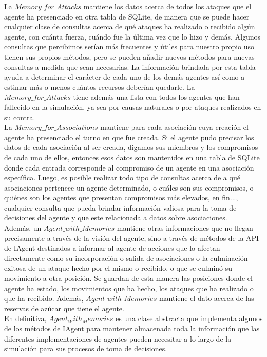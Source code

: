 \documentclass[11pt]{article}
\begin{document}
La $Memory\_for\_Attacks$ mantiene los datos acerca de todos los ataques que el agente ha presenciado en otra tabla de SQLite, de manera que se puede hacer cualquier clase de consultas acerca de qué ataques ha realizado o recibido algún agente, con cuánta fuerza, cuándo fue la última vez que lo hizo y demás. Algunos consultas que percibimos serían más frecuentes y útiles para nuestro propio uso tienen sus propios métodos, pero se pueden añadir nuevos métodos para nuevas consultas a medida que sean necesarias. La información brindada por esta tabla ayuda a determinar el carácter de cada uno de los demás agentes así como a estimar más o menos cuántos recursos deberían quedarle. La $Memory\_for\_Attacks$ tiene además una lista con todos los agentes que han fallecido en la simulación, ya sea por causas naturales o por ataques realizados en su contra.\\
La $Memory\_for\_Associations$ mantiene para cada asociación cuya creación el agente ha presenciado el turno en que fue creada. Si el agente pudo precisar los datos de cada asociación al ser creada, digamos sus miembros y los compromisos de cada uno de ellos, entonces esos datos son mantenidos en una tabla de SQLite donde cada entrada corresponde al compromiso de un agente en una asociación específica. Luego, es posible realizar todo tipo de consultas acerca de a qué asociaciones pertenece un agente determinado, o cuáles son sus compromisos, o quiénes son los agentes que presentan compromisos más elevados, en fin..., cualquier consulta que pueda brindar información valiosa para la toma de decisiones del agente y que este relacionada a datos sobre asociaciones.\\
Además, un $Agent\_with\_Memories$ mantiene otras informaciones que no llegan precisamente a través de la visión del agente, sino a través de métodos de la API de IAgent destinados a informar al agente de acciones que lo afectan directamente como su incorporación o salida de asociaciones o la culminación exitosa de un ataque hecho por el mismo o recibido, o que se culminó su movimiento a otra posición. Se guardan de esta manera las posiciones donde el agente ha estado, los movimientos que ha hecho, los ataques que ha realizado o que ha recibido. Además, $Agent\_with\_Memories$ mantiene el dato acerca de las reservas de azúcar que tiene el agente.\\
En definitiva, $Agent_With_Memories$ es una clase abstracta que implementa algunos de los métodos de IAgent para mantener almacenada toda la información que las diferentes implementaciones de agentes pueden necesitar a lo largo de la simulación para sus procesos de toma de decisiones.\\
\end{document}

